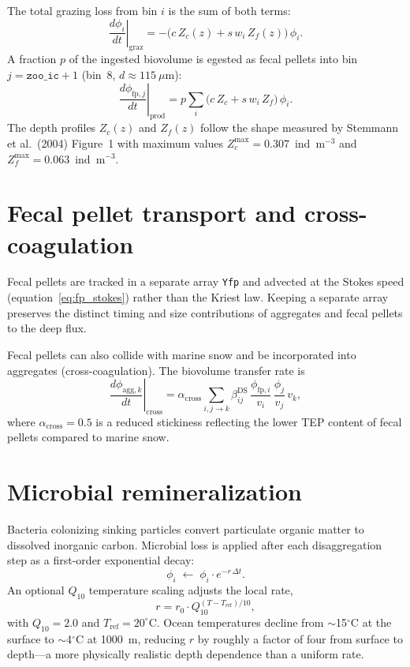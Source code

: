\documentclass[12pt,a4paper]{report}
\numberwithin{equation}{chapter}
\begin{document}
The total grazing loss from bin $i$ is the sum of both terms:
\begin{equation}
    \left.\frac{d\phi_i}{dt}\right|_\mathrm{graz}
    = -\bigl(c\,Z_c(z) + s\,w_i\,Z_f(z)\bigr)\,\phi_i.
    \label{eq:grazing}
\end{equation}
A fraction $p$ of the ingested biovolume is egested as fecal pellets into
bin $j = \texttt{zoo\_ic} + 1$ (bin~8, $d \approx 115~\mu$m):
\begin{equation}
    \left.\frac{d\phi_{\mathrm{fp},j}}{dt}\right|_\mathrm{prod}
    = p\sum_i \bigl(c\,Z_c + s\,w_i\,Z_f\bigr)\,\phi_i.
    \label{eq:fecal_prod}
\end{equation}
The depth profiles $Z_c(z)$ and $Z_f(z)$ follow the shape measured by
Stemmann et al.\ (2004) Figure~1 with maximum values
$Z_c^\mathrm{max} = 0.307$~ind~m$^{-3}$ and $Z_f^\mathrm{max} = 0.063$~ind~m$^{-3}$.

\section{Fecal pellet transport and cross-coagulation}

Fecal pellets are tracked in a separate array \texttt{Yfp} and advected at
the Stokes speed (equation~\ref{eq:fp_stokes}) rather than the Kriest law.
Keeping a separate array preserves the distinct timing and size contributions
of aggregates and fecal pellets to the deep flux.

Fecal pellets can also collide with marine snow and be incorporated into
aggregates (cross-coagulation). The biovolume transfer rate is
\begin{equation}
    \left.\frac{d\phi_{\mathrm{agg},k}}{dt}\right|_\mathrm{cross}
    = \alpha_\mathrm{cross}
      \sum_{i,j \to k}\beta_{ij}^\mathrm{DS}\,
      \frac{\phi_{\mathrm{fp},i}}{v_i}\,
      \frac{\phi_j}{v_j}\,v_k,
    \label{eq:cross_coag}
\end{equation}
where $\alpha_\mathrm{cross} = 0.5$ is a reduced stickiness reflecting the
lower TEP content of fecal pellets compared to marine snow.

\section{Microbial remineralization}

Bacteria colonizing sinking particles convert particulate organic matter to
dissolved inorganic carbon. Microbial loss is applied after each disaggregation
step as a first-order exponential decay:
\begin{equation}
    \phi_i \;\leftarrow\; \phi_i \cdot e^{-r\,\Delta t}.
    \label{eq:microbe}
\end{equation}
An optional $Q_{10}$ temperature scaling adjusts the local rate,
\begin{equation}
    r = r_0 \cdot Q_{10}^{(T - T_\mathrm{ref})/10},
    \label{eq:q10}
\end{equation}
with $Q_{10} = 2.0$ and $T_\mathrm{ref} = 20^\circ$C. Ocean temperatures
decline from $\sim$15$^\circ$C at the surface to $\sim$4$^\circ$C at 1000~m,
reducing $r$ by roughly a factor of four from surface to depth---a more
physically realistic depth dependence than a uniform rate.
\end{document}
